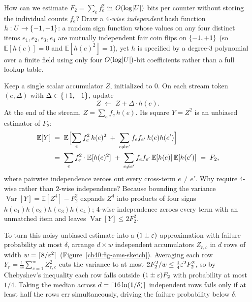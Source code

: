 \begin{intuitionbox}
How can we estimate $F_2 = \sum_e f_e^2$ in $O(\log\lvert U\rvert)$ bits per counter
without storing the individual counts $f_e$? Draw a \emph{$4$-wise independent}
hash function $h: U \to \{-1,+1\}$: a random sign function whose values on any
four distinct items $e_1,e_2,e_3,e_4$ are mutually independent fair coin flips
on $\{-1,+1\}$ (so $\mathbb{E}[h(e)]=0$ and $\mathbb{E}[h(e)^2]=1$), yet $h$
is specified by a degree-$3$ polynomial over a finite field using only four
$O(\log\lvert U\rvert)$-bit coefficients rather than a full lookup table.

Keep a single scalar accumulator $Z$, initialized to $0$. On each stream token
$(e,\Delta)$ with $\Delta\in\{+1,-1\}$, update
\[
  Z \;\gets\; Z + \Delta \cdot h(e).
\]
At the end of the stream, $Z = \sum_e f_e\, h(e)$. Its square $Y = Z^2$ is an
unbiased estimator of $F_2$:
\begin{align*}
  \mathbb{E}[Y]
  &\;=\; \mathbb{E}\Bigl[\sum_e f_e^2\, h(e)^2 \;+\; \sum_{e \neq e'} f_e f_{e'}\, h(e)h(e')\Bigr]\\
  &\;=\; \sum_e f_e^2 \cdot \mathbb{E}[h(e)^2] \;+\; \sum_{e \neq e'} f_e f_{e'}\,\mathbb{E}[h(e)]\,\mathbb{E}[h(e')]
  \;=\; F_2,
\end{align*}
where pairwise independence zeroes out every cross-term $e \neq e'$. Why require
$4$-wise rather than $2$-wise independence? Because bounding the variance
$\operatorname{Var}[Y] = \mathbb{E}[Z^4] - F_2^2$ expands $Z^4$ into products of
four signs $h(e_1)h(e_2)h(e_3)h(e_4)$; $4$-wise independence zeroes every term
with an unmatched item and leaves $\operatorname{Var}[Y] \le 2 F_2^2$.

To turn this noisy unbiased estimate into a $(1\pm\varepsilon)$ approximation with
failure probability at most $\delta$, arrange $d \times w$ independent
accumulators $Z_{r,c}$ in $d$ rows of width $w = \lceil8/\varepsilon^2\rceil$
(Figure~\ref{ch40:fig-ams-sketch}). Averaging each row
$\bar Y_r = \frac{1}{w}\sum_{c=1}^w Z_{r,c}^2$ cuts the variance to at most
$2F_2^2/w \le \frac{1}{4}\varepsilon^2 F_2^2$, so by Chebyshev's inequality each row
falls outside $(1\pm\varepsilon)F_2$ with probability at most $1/4$. Taking the median
across $d = \lceil16\ln(1/\delta)\rceil$ independent rows fails only if at least half
the rows err simultaneously, driving the failure probability below $\delta$.
\end{intuitionbox}

